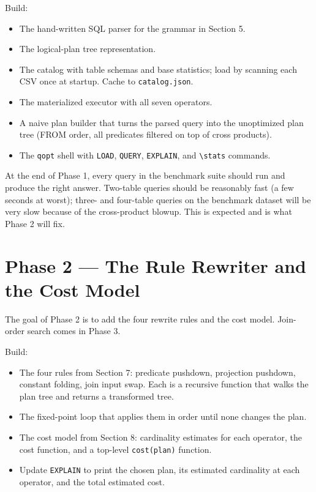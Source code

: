 \documentclass[11pt,a4paper]{article}
\begin{document}
Build:
\begin{itemize}
\item The hand-written SQL parser for the grammar in Section 5.
\item The logical-plan tree representation.
\item The catalog with table schemas and base statistics; load by scanning each CSV once at startup. Cache to \texttt{catalog.json}.
\item The materialized executor with all seven operators.
\item A naive plan builder that turns the parsed query into the unoptimized plan tree (FROM order, all predicates filtered on top of cross products).
\item The \texttt{qopt} shell with \texttt{LOAD}, \texttt{QUERY}, \texttt{EXPLAIN}, and \texttt{\textbackslash stats} commands.
\end{itemize}

At the end of Phase 1, every query in the benchmark suite should run and produce the right answer. Two-table queries should be reasonably fast (a few seconds at worst); three- and four-table queries on the benchmark dataset will be very slow because of the cross-product blowup. This is expected and is what Phase 2 will fix.

\section{Phase 2 --- The Rule Rewriter and the Cost Model}

The goal of Phase 2 is to add the four rewrite rules and the cost model. Join-order search comes in Phase 3.

Build:
\begin{itemize}
\item The four rules from Section 7: predicate pushdown, projection pushdown, constant folding, join input swap. Each is a recursive function that walks the plan tree and returns a transformed tree.
\item The fixed-point loop that applies them in order until none changes the plan.
\item The cost model from Section 8: cardinality estimates for each operator, the cost function, and a top-level \texttt{cost(plan)} function.
\item Update \texttt{EXPLAIN} to print the chosen plan, its estimated cardinality at each operator, and the total estimated cost.
\end{itemize}
\end{document}
